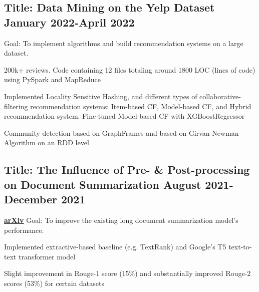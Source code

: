 \documentclass[11pt]{article}
\begin{document}
\vspace{0.1in}

\subsection*{Title: Data Mining on the Yelp Dataset \hfill {\normalfont January 2022-April 2022}}
\noindent
Goal: To implement algorithms and build recommendation systems on a large dataset.
\begin{compactitem}
	\item 200k+ reviews. Code containing 12 files totaling around 1800 LOC (lines of code) using PySpark and MapReduce
	\item Implemented Locality Sensitive Hashing, and different types of collaborative-filtering recommendation systems: Item-based CF, Model-based CF, and Hybrid recommendation system. Fine-tuned Model-based CF with XGBoostRegressor
	\item Community detection based on GraphFrames and based on Girvan-Newman Algorithm on an RDD level
\end{compactitem}

\subsection*{Title: The Influence of Pre- \& Post-processing on Document Summarization \hfill {\normalfont August
        2021-December 2021}}
\noindent
\href{https://github.com/Anthonyive/csci-544-project.git}{}  \href{https://www.youtube.com/watch?v=oVIVtOPeWEs}{} \href{https://arxiv.org/abs/2112.01660}{\textbf{arXiv}} Goal: To improve the existing long document summarization model's performance.
\begin{compactitem}
    \item Implemented extractive-based baseline (e.g. TextRank) and Google's T5 text-to-text transformer model
    \item Slight improvement in Rouge-1 score (15\%) and substantially improved Rouge-2 scores (53\%) for certain datasets
\end{compactitem}
\end{document}
